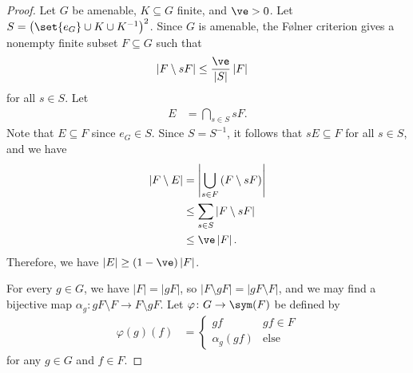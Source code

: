 \documentclass[10pt]{mypackage}
\begin{document}
\begin{proof}
  Let $G$ be amenable, $K\subseteq G$ finite, and $\ve > 0$. Let $S = \left( \set{e_G}\cup K\cup K^{-1} \right)^2$. Since $G$ is amenable, the Følner criterion gives a nonempty finite subset $F\subseteq G$ such that
  \begin{align*}
    \left\vert F\setminus sF \right\vert &\leq \frac{\ve}{\left\vert S \right\vert}\left\vert F \right\vert
  \end{align*}
  for all $s\in S$. Let
  \begin{align*}
    E &= \bigcap_{s\in S} sF.
  \end{align*}
  Note that $E\subseteq F$ since $e_G\in S$. Since $S = S^{-1}$, it follows that $sE\subseteq F$ for all $s\in S$, and we have
  \begin{align*}
    \left\vert F\setminus E \right\vert &= \left\vert \bigcup_{s\in F}\left( F\setminus sF \right) \right\vert\\
                                        &\leq \sum_{s\in S} \left\vert F\setminus sF \right\vert\\
                                        &\leq \ve \left\vert F \right\vert.
  \end{align*}
  Therefore, we have $\left\vert E \right\vert\geq \left( 1-\ve \right)\left\vert F \right\vert$.

  For every $g\in G$, we have $\left\vert F \right\vert = \left\vert gF \right\vert$, so $\left\vert F\setminus gF \right\vert = \left\vert gF\setminus F \right\vert$, and we may find a bijective map $\alpha_g\colon gF\setminus F\rightarrow F\setminus gF$. Let $\varphi\colon G\to \sym(F)$ be defined by
  \begin{align*}
    \varphi(g)(f) &= \begin{cases}
      gf & gf\in F\\
      \alpha_g(gf) & \text{else}
    \end{cases}
  \end{align*}
  for any $g\in G$ and $f\in F$.


\end{proof}
\end{document}
